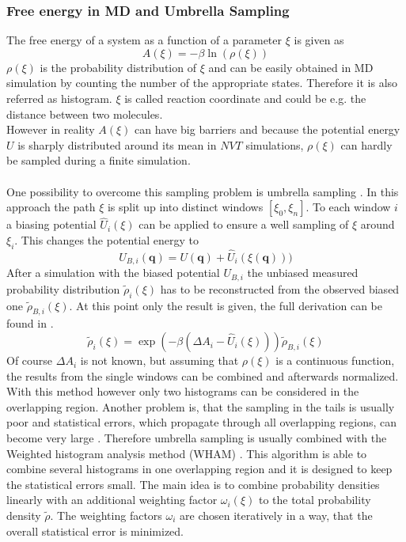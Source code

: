 \subsubsection{Free energy in MD and Umbrella Sampling}
The free energy of a system as a function of a parameter $\xi$ is given as
\begin{equation}
\label{eq:free_energy_from_rho}
A(\xi) = - \beta \ln\left(\rho(\xi)\right)
\end{equation}
$\rho(\xi)$ is the probability distribution of $\xi$ and can be easily obtained in MD simulation by counting the number of the appropriate states. Therefore it is also referred as histogram. $\xi$ is called reaction coordinate and could be e.g. the distance between two molecules.\\
However in reality $A(\xi)$ can have big barriers and because the potential energy $U$ is sharply distributed around its mean in $NVT$ simulations, $\rho(\xi)$ can hardly be sampled during a finite simulation.\\
\\
One possibility to overcome this sampling problem is umbrella sampling \autocite{originalUmbrellaSampling}. In this approach the path $\xi$ is split up into distinct windows $[\xi_0, \xi_n]$. To each window $i$ a biasing potential $\hat{U}_i(\xi)$ can be applied to ensure a well sampling of $\xi$ around $\xi_i$. This changes the potential energy to
\begin{equation}
U_{B, i}(\mathbf{q}) = U(\mathbf{q}) + \hat{U}_i(\xi(\mathbf{q})))
\end{equation}
After a simulation with the biased potential $U_{B, i}$ the unbiased measured probability distribution $\tilde{\rho}_i(\xi)$ has to be reconstructed from the observed biased one $\tilde{\rho}_{B, i}(\xi)$. At this point only the result is given, the full derivation can be found in \textcite[p. 179ff]{UnderstandingMD}.\\
 \begin{equation}
 \label{eq:reconstruction_from_biased}
 \tilde{\rho}_{i}(\xi) = \exp\left(-\beta\left(\Delta A_i - \hat{U}_i(\xi)\right)\right)\tilde{\rho}_{B, i}(\xi)
 \end{equation}
Of course $\Delta A_i$ is not known, but assuming that $\rho(\xi)$ is a continuous function, the results from the single windows can be combined and afterwards normalized.\\
With this method however only two histograms can be considered in the overlapping region. Another problem is, that the sampling in the tails is usually poor and statistical errors, which propagate through all overlapping regions, can become very large \autocite[236ff]{freeEnergyBook}. Therefore umbrella sampling is usually combined with the Weighted histogram analysis method (WHAM) \autocites{originalWHAM, extensionWHAM}. This algorithm is able to combine several histograms in one overlapping region and it is designed to keep the statistical errors small. The main idea is to combine probability densities linearly with an additional weighting factor $\omega_i(\xi)$ to the total probability density $\tilde{\rho}$. The weighting factors $\omega_i$ are chosen iteratively in a way, that the overall statistical error is minimized.\\